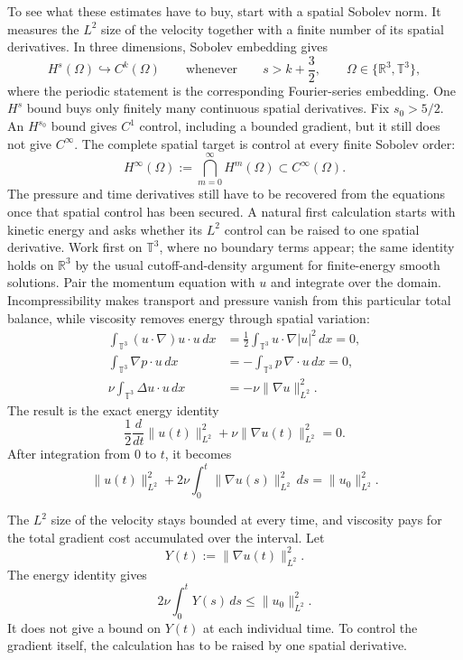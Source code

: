 To see what these estimates have to buy, start with a spatial Sobolev norm.
It measures the \(L^2\) size of the velocity together with a finite number of its spatial derivatives.
In three dimensions, Sobolev embedding gives \parencite[Theorem~7.28 for \(\mathbb R^3\)]{Cerda2010}
\[
  H^s(\Omega)\hookrightarrow C^k(\Omega)
  \qquad\text{whenever}\qquad
  s>k+\frac32,
  \qquad
  \Omega\in\{\mathbb R^3,\mathbb T^3\},
\]
where the periodic statement is the corresponding Fourier-series embedding.
One \(H^s\) bound buys only finitely many continuous spatial derivatives.
Fix \(s_0>5/2\).
An \(H^{s_0}\) bound gives \(C^1\) control, including a bounded gradient, but it still does not give \(C^\infty\).
The complete spatial target is control at every finite Sobolev order:
\[
  H^\infty(\Omega)
  :=
  \bigcap_{m=0}^{\infty}H^m(\Omega)
  \subset
  C^\infty(\Omega).
\]
The pressure and time derivatives still have to be recovered from the equations once that spatial control has been secured.
A natural first calculation starts with kinetic energy and asks whether its \(L^2\) control can be raised to one spatial derivative.
Work first on \(\mathbb T^3\), where no boundary terms appear; the same identity holds on \(\mathbb R^3\) by the usual cutoff-and-density argument for finite-energy smooth solutions.
Pair the momentum equation with \(u\) and integrate over the domain.
Incompressibility makes transport and pressure vanish from this particular total balance, while viscosity removes energy through spatial variation:
\[
  \begin{aligned}
  \int_{\mathbb T^3}(u\cdot\nabla)u\cdot u\,dx
  &=
  \frac12\int_{\mathbb T^3}u\cdot\nabla|u|^2\,dx
  =0,
  \\
  \int_{\mathbb T^3}\nabla p\cdot u\,dx
  &=
  -\int_{\mathbb T^3}p\,\nabla\cdot u\,dx
  =0,
  \\
  \nu\int_{\mathbb T^3}\Delta u\cdot u\,dx
  &=
  -\nu\lVert\nabla u\rVert_{L^2}^2.
  \end{aligned}
\]
The result is the exact energy identity
\[
  \frac12\frac{d}{dt}\lVert u(t)\rVert_{L^2}^2
  +
  \nu\lVert\nabla u(t)\rVert_{L^2}^2
  =0.
\]
After integration from \(0\) to \(t\), it becomes
\[
  \lVert u(t)\rVert_{L^2}^2
  +
  2\nu\int_0^t\lVert\nabla u(s)\rVert_{L^2}^2\,ds
  =
  \lVert u_0\rVert_{L^2}^2.
\]

The \(L^2\) size of the velocity stays bounded at every time, and viscosity pays for the total gradient cost accumulated over the interval.
Let
\[
  Y(t):=\lVert\nabla u(t)\rVert_{L^2}^2.
\]
The energy identity gives
\[
  2\nu\int_0^tY(s)\,ds
  \leq
  \lVert u_0\rVert_{L^2}^2.
\]
It does not give a bound on \(Y(t)\) at each individual time.
To control the gradient itself, the calculation has to be raised by one spatial derivative.

